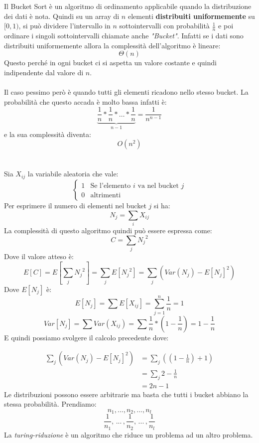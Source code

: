 \documentclass[a4paper]{article}
\begin{document}
Il Bucket Sort è un algoritmo di ordinamento applicabile quando la distribuzione dei dati è nota. Quindi
su un array di $n$ elementi \textbf{distribuiti uniformemente} su $[0, 1)$, si può dividere l'intervallo in $n$ sottointervalli
con probabilità $\frac{1}{n}$ e poi ordinare i singoli sottointervalli chiamate anche \textit{"Bucket"}.
Infatti se i dati sono distribuiti uniformemente allora la complessità dell'algoritmo è lineare: \[\Theta(n)\]Questo
perché in ogni bucket ci si aspetta un valore costante e quindi indipendente dal valore di $n$.
\\\\Il caso pessimo però è quando tutti gli elementi ricadono nello stesso bucket. La probabilità che questo accada è molto bassa
infatti è: \[\underbrace{\frac{1}{n} \ast \frac{1}{n} \ast \dots \ast \frac{1}{n}}_{n-1}  = \frac{1}{n^{n-1}}\]e la sua complessità diventa: \[O(n^2)\]
\\\\
Sia \(X_{ij}\) la variabile aleatoria che vale:
\[
\begin{cases}
  1 & \text{Se l'elemento } i \text{ va nel bucket } j\\
  0 & \text{altrimenti}
\end{cases}
\]
Per esprimere il numero di elementi nel bucket $j$ si ha:
\[
  N_j = \sum_{i} X_{ij}
\]
La complessità di questo algoritmo quindi può essere espressa come:
\[
  C = \sum_j {N_j}^2
\]
Dove il valore atteso è:
\[E[C] = E\left[ \sum_j {N_j}^2\right] = \sum_j E[{N_j}^2] = \sum_j\left(Var(N_j) - E[N_j]^2\right)\]
Dove $E[N_j]$ è:
\[E[N_j] = \sum E[X_{ij}] = \sum_{j=1}^n \frac{1}{n} = 1\]
\[Var[N_j] = \sum Var(X_{ij}) = \sum \frac{1}{n} * \left(1 - \frac{1}{n}\right) = 1 - \frac{1}{n}\]
E quindi possiamo svolgere il calcolo precedente dove:

\begin{align*}
  \sum_j \left(Var(N_j) - E[N_j]^2\right) &=  \sum_j \left(\left(1 - \frac{1}{n}\right) + 1\right) \\ &= \sum_j 2 - \frac{1}{n}\\  &= 2n - 1
\end{align*}
Le distribuzioni possono essere arbitrarie ma basta che tutti i bucket abbiano la stessa probabilità.
Prendiamo:
\[n_1, ..., n_2, ... , n_l\]
\[\frac{1}{n_1}, \, ... \,  , \frac{1}{n_2}, \, ... \, , \frac{1}{n_l}\]
La \textit{turing-riduzione} è un algoritmo che riduce un problema ad un altro problema.
\end{document}
